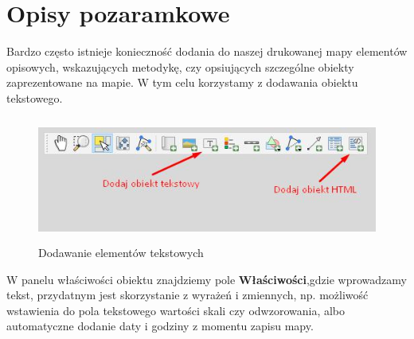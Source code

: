 \documentclass[12pt,a4paper]{book}
\begin{document}
\section{Opisy pozaramkowe}
Bardzo często istnieje konieczność dodania do naszej drukowanej mapy elementów opisowych, wskazujących metodykę, czy opsiujących szczególne obiekty zaprezentowane na mapie. W tym celu korzystamy z dodawania obiektu tekstowego.

\begin{center}
\begin{figure}
\includegraphics[width=13.31cm,height=4.128cm]{008-tekstowe.jpg}
\caption{Dodawanie elementów tekstowych}
\end{figure}
\end{center}
W panelu właściwości obiektu znajdziemy pole \textbf{Właściwości},gdzie wprowadzamy tekst, przydatnym jest skorzystanie z wyrażeń i zmiennych, np. możliwość wstawienia do pola tekstowego wartości skali czy odwzorowania, albo automatyczne dodanie daty i godziny z momentu zapisu mapy.
\end{document}
